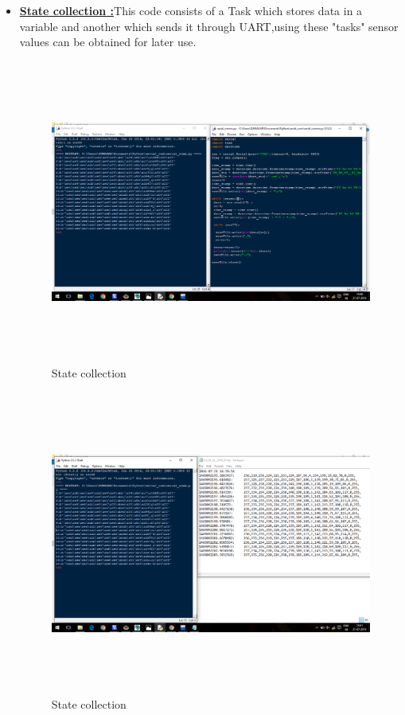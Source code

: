 \documentclass[a4paper,12pt,oneside]{book}
\begin{document}
\begin{itemize}
\item \textbf{\href{https://github.com/eYSIP-2016/RTOS_LPC2148/tree/master/State_collector}{State collection :}}This code consists of a Task which stores data in a variable and another which sends it through UART,using these "tasks" sensor values can be obtained for later use.
\begin{figure}[h]
\centering
\includegraphics[width=15cm,height=10cm]{Statecollection.png}
\caption{State collection}
\end{figure}
\begin{figure}[h]
\centering
\includegraphics[width=15cm,height=10cm]{Statecollection2.png}
\caption{State collection}
\end{figure}


\end{itemize}
\end{document}
